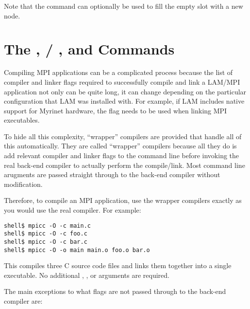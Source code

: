 Note that the  command can optionally be used to fill the
empty slot with a new node.


\section{The ,  / , and
   Commands}
\label{sec:commands-wrappers}

Compiling MPI applications can be a complicated process because the
list of compiler and linker flags required to successfully compile and
link a LAM/MPI application not only can be quite long, it can change
depending on the particular configuration that LAM was installed with.
For example, if LAM includes native support for Myrinet hardware, the
 flag needs to be used when linking MPI executables.

To hide all this complexity, ``wrapper'' compilers are provided that
handle all of this automatically.  They are called ``wrapper''
compilers because all they do is add relevant compiler and linker
flags to the command line before invoking the real back-end compiler
to actually perform the compile/link.  Most command line arugments are
passed straight through to the back-end compiler without modification.

Therefore, to compile an MPI application, use the wrapper compilers
exactly as you would use the real compiler.  For example:

\lstset{style=lam-cmdline}
\begin{lstlisting}
shell$ mpicc -O -c main.c
shell$ mpicc -O -c foo.c
shell$ mpicc -O -c bar.c
shell$ mpicc -O -o main main.o foo.o bar.o
\end{lstlisting}

This compiles three C source code files and links them together into a
single executable.  No additional , , or
 arguments are required.

The main exceptions to what flags are not passed through to the
back-end compiler are:

